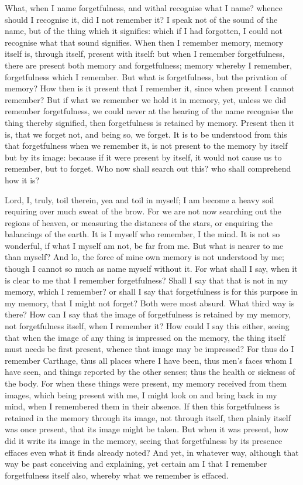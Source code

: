 \documentclass[b5paper,openright,12pt,twoside]{book}
\begin{document}
What, when I name forgetfulness, and withal recognise what I name?
whence should I recognise it, did I not remember it? I speak not of the
sound of the name, but of the thing which it signifies: which if I had
forgotten, I could not recognise what that sound signifies. When then I
remember memory, memory itself is, through itself, present with itself:
but when I remember forgetfulness, there are present both memory
and forgetfulness; memory whereby I remember, forgetfulness which I
remember. But what is forgetfulness, but the privation of memory? How
then is it present that I remember it, since when present I cannot
remember? But if what we remember we hold it in memory, yet, unless we
did remember forgetfulness, we could never at the hearing of the name
recognise the thing thereby signified, then forgetfulness is retained by
memory. Present then it is, that we forget not, and being so, we forget.
It is to be understood from this that forgetfulness when we remember it,
is not present to the memory by itself but by its image: because if
it were present by itself, it would not cause us to remember, but to
forget. Who now shall search out this? who shall comprehend how it is?

Lord, I, truly, toil therein, yea and toil in myself; I am become a
heavy soil requiring over much sweat of the brow. For we are not now
searching out the regions of heaven, or measuring the distances of the
stars, or enquiring the balancings of the earth. It is I myself who
remember, I the mind. It is not so wonderful, if what I myself am not,
be far from me. But what is nearer to me than myself? And lo, the force
of mine own memory is not understood by me; though I cannot so much as
name myself without it. For what shall I say, when it is clear to
me that I remember forgetfulness? Shall I say that that is not in my
memory, which I remember? or shall I say that forgetfulness is for this
purpose in my memory, that I might not forget? Both were most absurd.
What third way is there? How can I say that the image of forgetfulness
is retained by my memory, not forgetfulness itself, when I remember it?
How could I say this either, seeing that when the image of any thing is
impressed on the memory, the thing itself must needs be first present,
whence that image may be impressed? For thus do I remember Carthage,
thus all places where I have been, thus men's faces whom I have seen,
and things reported by the other senses; thus the health or sickness of
the body. For when these things were present, my memory received from
them images, which being present with me, I might look on and bring
back in my mind, when I remembered them in their absence. If then this
forgetfulness is retained in the memory through its image, not through
itself, then plainly itself was once present, that its image might
be taken. But when it was present, how did it write its image in the
memory, seeing that forgetfulness by its presence effaces even what it
finds already noted? And yet, in whatever way, although that way be
past conceiving and explaining, yet certain am I that I remember
forgetfulness itself also, whereby what we remember is effaced.
\end{document}
